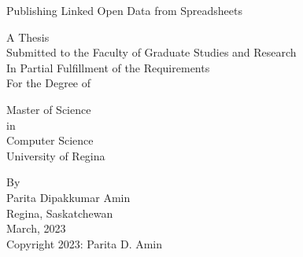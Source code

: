 \documentclass[12pt]{report}
\theoremstyle{definition}
\begin{document}
\begin{titlepage}
    \begin{center}
    \begin{doublespace}
        \vspace*{3cm}

        \large

			Publishing Linked Open Data from Spreadsheets

        \vspace{1cm}

        \large
        A Thesis\\
        Submitted to the Faculty of Graduate Studies and Research\\
        In Partial Fulfillment of the Requirements\\
        For the Degree of\\
        
        \vspace{0.8cm}
        
        Master of Science\\
        in\\
        Computer Science\\
        University of Regina\\

        \vspace{0.8cm}

        \normalsize
        By\\
        Parita Dipakkumar Amin\\
        Regina, Saskatchewan\\
        March, 2023\\

        \vspace{0.8cm}
        \textcopyright \hspace*{0.2cm} Copyright 2023: Parita D. Amin
    \end{doublespace}
    \end{center}
\end{titlepage}

\newpage
{}


\newpage
{}


\newpage
{}


\renewcommand{\contentsname}{Table of Contents}
\tableofcontents
\cleardoublepage
\end{document}
